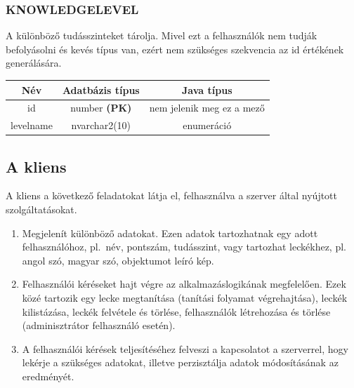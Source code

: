 \documentclass[11pt, a4paper]{article}
\begin{document}
    \subsubsection{KNOWLEDGELEVEL}
    A különböző tudásszinteket tárolja. Mivel ezt a felhasználók nem tudják befolyásolni és kevés típus van, ezért nem szükséges szekvencia az id értékének generálására.
    
    \begin{table}[!h]
    	\centering
    	\begin{tabular} {|c|c|c|}
    		\hline
    		Név & Adatbázis típus & Java típus \\
    		\hline
    		id & number \textbf{(PK)} & nem jelenik meg ez a mező \\
    		levelname & nvarchar2(10) & enumeráció \\
    		\hline
    	\end{tabular}
    \end{table}
    
    \subsection{A kliens}
    \label{sec:kliens}
    A kliens a következő feladatokat látja el, felhasználva a szerver által nyújtott szolgáltatásokat.
    \begin{enumerate}
    	\item Megjelenít különböző adatokat. Ezen adatok tartozhatnak egy adott felhasználóhoz, pl.~név, pontszám, tudásszint, vagy tartozhat leckékhez, pl. angol szó, magyar szó, objektumot leíró kép.
    	\item Felhasználói kéréseket hajt végre az alkalmazáslogikának megfelelően. Ezek közé tartozik egy lecke megtanítása (tanítási folyamat végrehajtása), leckék kilistázása, leckék felvétele és törlése, felhasználók létrehozása és törlése (adminisztrátor felhasználó esetén).
    	\item A felhasználói kérések teljesítéséhez felveszi a kapcsolatot a szerverrel, hogy lekérje a szükséges adatokat, illetve perzisztálja adatok módosításának az eredményét.
    \end{enumerate}
\end{document}
